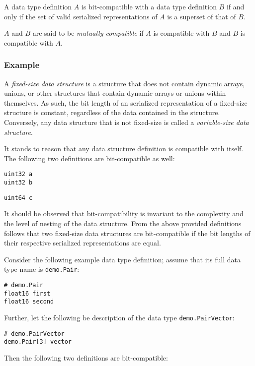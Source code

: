 A data type definition $A$ is bit-compatible with a data type definition $B$ if and only if
the set of valid serialized representations of $A$ is a superset of that of $B$.

$A$ and $B$ are said to be \emph{mutually compatible} if
$A$ is compatible with $B$ and $B$ is compatible with $A$.

\subsubsection{Example}

A \emph{fixed-size data structure} is a structure that does not contain dynamic arrays,
unions, or other structures that contain dynamic arrays or unions within themselves.
As such, the bit length of an serialized representation of a fixed-size structure is constant,
regardless of the data contained in the structure.
Conversely, any data structure that is not fixed-size is called a \emph{variable-size data structure}.

It stands to reason that any data structure definition is compatible with itself.
The following two definitions are bit-compatible as well:

\begin{verbatim}
uint32 a
uint32 b
\end{verbatim}

\begin{verbatim}
uint64 c
\end{verbatim}

It should be observed that bit-compatibility is invariant to the complexity and the level of nesting
of the data structure.
From the above provided definitions follows that two fixed-size data structures are bit-compatible if the
bit lengths of their respective serialized representations are equal.

Consider the following example data type definition; assume that its full data type name is
\verb|demo.Pair|:

\begin{verbatim}
# demo.Pair
float16 first
float16 second
\end{verbatim}

Further, let the following be description of the data type \verb|demo.PairVector|:

\begin{verbatim}
# demo.PairVector
demo.Pair[3] vector
\end{verbatim}

Then the following two definitions are bit-compatible:

